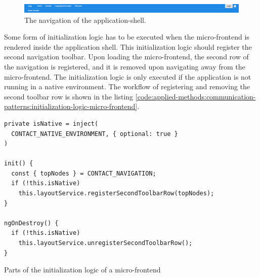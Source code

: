 \ifshowImages
  \begin{figure}[H]
  \centering
  \includegraphics[width=1\linewidth]{images/applied-methods/communication-patterns/host-contact-header.png}
  \caption{The navigation of the application-shell.}\label{fig:applied-methods:communication-patterns:application-shell-header}
  \end{figure}
\fi

\noindent Some form of initialization logic has to be executed when the micro-frontend is rendered inside the application shell. This initialization logic should register the second navigation toolbar. Upon loading the micro-frontend, the second row of the navigation is registered, and it is removed upon navigating away from the micro-frontend. The initialization logic is only executed if the application is not running in a native environment. The workflow of registering and removing the second toolbar row is shown in the listing \ref{code:applied-methods:communication-patterns:initialization-logic-micro-frontend}.

\ifshowListings
  \begin{listing}[H]
  \begin{verbatim}
private isNative = inject(
  CONTACT_NATIVE_ENVIRONMENT, { optional: true }
)

init() {
  const { topNodes } = CONTACT_NAVIGATION;
  if (!this.isNative)
    this.layoutService.registerSecondToolbarRow(topNodes);
}

ngOnDestroy() {
  if (!this.isNative)
    this.layoutService.unregisterSecondToolbarRow();
}
  \end{verbatim}
  \caption{Parts of the initialization logic of a micro-frontend}\label{code:applied-methods:communication-patterns:initialization-logic-micro-frontend}
  \end{listing}
\fi

